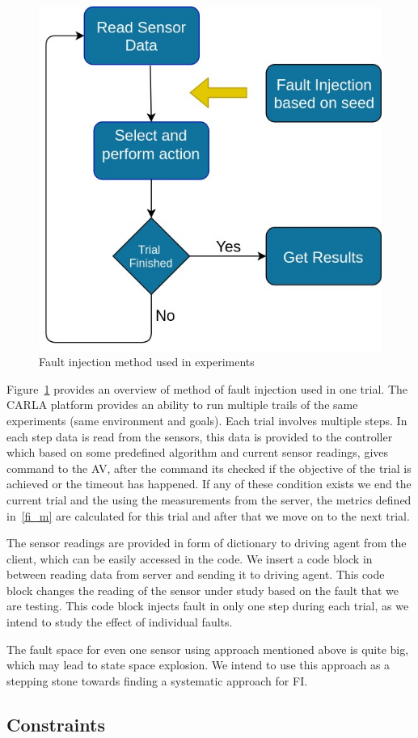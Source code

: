 \begin{figure}  [h]
	\vspace{-0.5em}
	\centering
	\includegraphics[scale=0.3]{FI_method}
	\vspace{-0.5em}
	\caption{Fault injection method used in experiments}
	\label{fig:FI_method}
	\vspace{-1.5em}
\end{figure}

Figure~\ref{fig:FI_method} provides an overview of method of fault injection used in one trial. The CARLA platform provides an ability to run multiple trails of the same experiments (same environment and goals). Each trial involves multiple steps. In each step data is read from the sensors, this data is provided to the controller which based on some predefined algorithm and current sensor readings, gives command to the AV, after the command its checked if the objective of the trial is achieved or the timeout has happened. If any of these condition exists we end the current trial and the using the measurements from the server, the metrics defined in~\ref{fi_m} are calculated for this trial and after that we move on to the next trial. 

The sensor readings are provided in form of dictionary to driving agent from the client, which can be easily accessed in the code. We insert a code block in between reading data from server and sending it to driving agent. This code block changes the reading of the sensor under study based on the fault that we are testing. This code block injects fault in only one step during each trial, as we intend to study the effect of individual faults. 

The fault space for even one sensor using approach mentioned above is quite big, which may lead to state space explosion. We intend to use this approach as a stepping stone towards finding a systematic approach for FI.  

\subsection{Constraints}
 